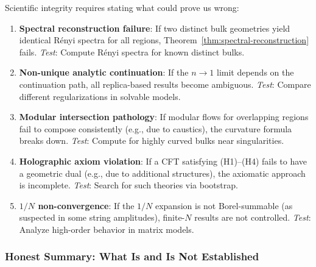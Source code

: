 \documentclass[12pt,a4paper]{article}
\begin{document}
Scientific integrity requires stating what could prove us wrong:

\begin{enumerate}
    \item \textbf{Spectral reconstruction failure}: If two distinct bulk geometries yield identical R\'enyi spectra for all regions, Theorem~\ref{thm:spectral-reconstruction} fails. \emph{Test}: Compute R\'enyi spectra for known distinct bulks.
    
    \item \textbf{Non-unique analytic continuation}: If the $n \to 1$ limit depends on the continuation path, all replica-based results become ambiguous. \emph{Test}: Compare different regularizations in solvable models.
    
    \item \textbf{Modular intersection pathology}: If modular flows for overlapping regions fail to compose consistently (e.g., due to caustics), the curvature formula breaks down. \emph{Test}: Compute for highly curved bulks near singularities.
    
    \item \textbf{Holographic axiom violation}: If a CFT satisfying (H1)--(H4) fails to have a geometric dual (e.g., due to additional structures), the axiomatic approach is incomplete. \emph{Test}: Search for such theories via bootstrap.
    
    \item \textbf{$1/N$ non-convergence}: If the $1/N$ expansion is not Borel-summable (as suspected in some string amplitudes), finite-$N$ results are not controlled. \emph{Test}: Analyze high-order behavior in matrix models.
\end{enumerate}

\subsubsection{Honest Summary: What Is and Is Not Established}
\end{document}

